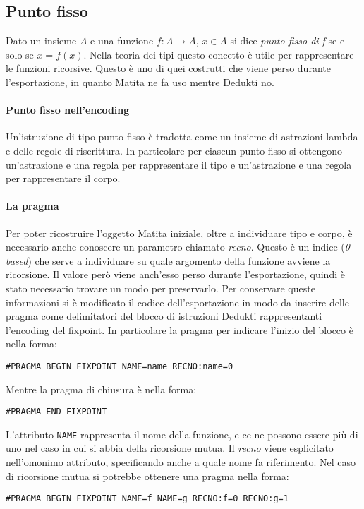 \documentclass[12pt,a4paper]{report}
\begin{document}
\subsection{Punto fisso}
Dato un insieme $A$ e una funzione $f: A \rightarrow A$, $x \in A$ si dice
\textit{punto fisso di f} se e solo se $x = f(x)$. Nella teoria dei tipi 
questo concetto è utile per rappresentare le funzioni ricorsive.
Questo è uno di quei costrutti che viene perso durante l'esportazione, in 
quanto Matita ne fa uso mentre Dedukti no.

\paragraph{Punto fisso nell'encoding} Un'istruzione di tipo punto fisso è tradotta
come un insieme di astrazioni lambda e delle regole di riscrittura. In particolare
per ciascun punto fisso si ottengono un'astrazione e una regola per rappresentare
il tipo e un'astrazione e una regola per rappresentare il corpo.

\paragraph{La pragma} Per poter ricostruire l'oggetto Matita iniziale, oltre
a individuare tipo e corpo, è necessario anche conoscere un parametro chiamato
\textit{recno}. Questo è un indice (\textit{0-based}) che serve a individuare
su quale argomento della funzione avviene la ricorsione. Il valore però viene
anch'esso perso durante l'esportazione, quindi è stato necessario trovare un
modo per preservarlo. Per conservare queste informazioni si è modificato il
codice dell'esportazione in modo da inserire delle pragma come delimitatori
del blocco di istruzioni Dedukti rappresentanti l'encoding del fixpoint.
In particolare la pragma per indicare l'inizio del blocco è nella forma:
\begin{center}
\texttt{\#PRAGMA BEGIN FIXPOINT NAME=name RECNO:name=0}
\end{center}
Mentre la pragma di chiusura è nella forma:
\begin{center}
\texttt{\#PRAGMA END FIXPOINT}
\end{center}

L'attributo \texttt{NAME} rappresenta il nome della funzione, e ce ne possono
essere più di uno nel caso in cui si abbia della ricorsione mutua. Il \textit{recno}
viene esplicitato nell'omonimo attributo, specificando anche a quale nome fa
riferimento. Nel caso di ricorsione mutua si potrebbe ottenere una pragma nella
forma:
\begin{center}
\texttt{\#PRAGMA BEGIN FIXPOINT NAME=f NAME=g RECNO:f=0 RECNO:g=1}
\end{center}
\end{document}
